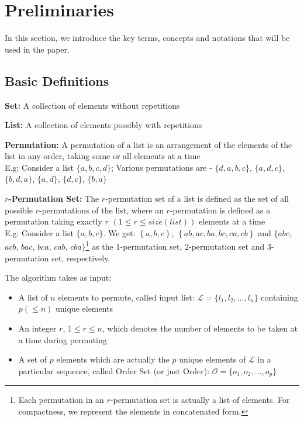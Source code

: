 \documentclass{article}
\begin{document}
\section{Preliminaries}
\label{sec:prelim}

In this section, we introduce the key terms, concepts and notations that will be used in the paper.

\subsection{Basic Definitions} 

\noindent \textbf{Set:} A collection of elements without repetitions

\noindent \textbf{List:} A collection of elements possibly with repetitions

\noindent \textbf{Permutation:} A permutation of a list is an arrangement of the elements of the list in any order, taking some or all elements at a time \\
E.g: Consider a list $\{a,b,c,d\}$; Various permutations are - $\{d,a,b,c\}$, $\{a,d,c\}$, $\{b,d,a\}$, $\{a,d\}$, $\{d,c\}$, $\{b,a\}$

\noindent \textbf{$r$-Permutation Set:} The $r$-permutation set of a list is defined as the set of all possible $r$-permutations of the list, where an $r$-permutation is defined as a permutation taking exactly $r$ $(1 \le r \le size(list))$ elements at a time\\
E.g: Consider a list $\{a, b, c\}$. We get: $\left\{a, b, c\right\}$, $\left\{ab, ac, ba, bc, ca, cb\right\}$ and $\{abc$, $acb$, $bac$, $bca$, $cab$, $cba\}$\footnote{Each permutation in an $r$-permutation set is actually a list of elements. For compactness, we represent the elements in concatenated form.} as the $1$-permutation set, $2$-permutation set and $3$-permutation set, respectively.

The algorithm takes as input:
\begin{itemize}
 \item A list of $n$ elements to permute, called input list: $\mathcal{L} = \{l_1, l_2, \ldots, l_n\}$ containing $p (\le n)$ unique elements
 \item An integer $r$, $1 \le r \le n$, which denotes the number of elements to be taken at a time during permuting
 \item A set of $p$ elements which are actually the $p$ unique elements of $\mathcal{L}$ in a particular sequence, called Order Set (or just Order): $\mathcal{O} = \{o_1, o_2, \ldots, o_p\}$
\end{itemize}
\end{document}
